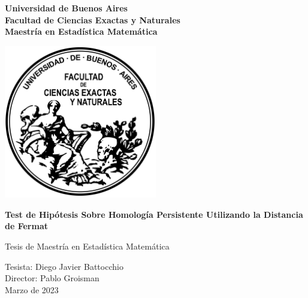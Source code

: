 \begin{titlepage}
	\begin{center}

	    \huge
		\textbf{Universidad de Buenos Aires}\\
		\vspace{0.3cm}
		\textbf{Facultad de Ciencias Exactas y Naturales}\\
        \vspace{0.3cm}
		\textbf{Maestría en Estadística Matemática}\\

		\vspace{1.5cm}

		\includegraphics[width=0.5\textwidth]{latex/logo.png}

		\vspace{1.5cm}

		\huge
        \textbf{Test de Hipótesis Sobre Homología Persistente Utilizando la Distancia de Fermat}\\

        \vspace{1.5cm}

        \textrm{Tesis de Maestría en Estadística Matemática}\\

		\vspace{1cm}

		\LARGE
		\textrm{Tesista: Diego Javier Battocchio} \\
		\textrm{Director: Pablo Groisman} \\

		\vfill
		\Large
		Marzo de 2023

	\end{center}
\end{titlepage}
